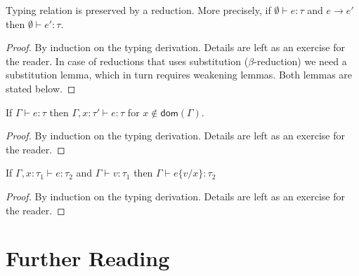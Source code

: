 \begin{theorem}
  Typing relation is preserved by a reduction.
  More precisely, if $\emptyset \vdash e : \tau$ and $e \longrightarrow e'$ then
  $\emptyset \vdash e' : \tau$.
\end{theorem}
\begin{proof}
  By induction on the typing derivation.
  Details are left as an exercise for the reader.
  In case of reductions that uses substitution ($\beta$-reduction)
  we need a substitution lemma, which in turn requires weakening lemmas.
  Both lemmas are stated below.
\end{proof}

\begin{lemma}[Weakening]
  If $\Gamma\vdash e : \tau$ then $\Gamma, x:\tau' \vdash e : \tau$
  for $x\not\in \textsf{dom}(\Gamma)$.
\end{lemma}
\begin{proof}
  By induction on the typing derivation.
  Details are left as an exercise for the reader.
\end{proof}

\begin{lemma}[Substitution]
  If $\Gamma, x:\tau_1 \vdash e : \tau_2$ and $\Gamma\vdash v : \tau_1$
  then $\Gamma\vdash e\{v/x\} : \tau_2$
\end{lemma}
\begin{proof}
  By induction on the typing derivation.
  Details are left as an exercise for the reader.
\end{proof}

\section{Further Reading}
